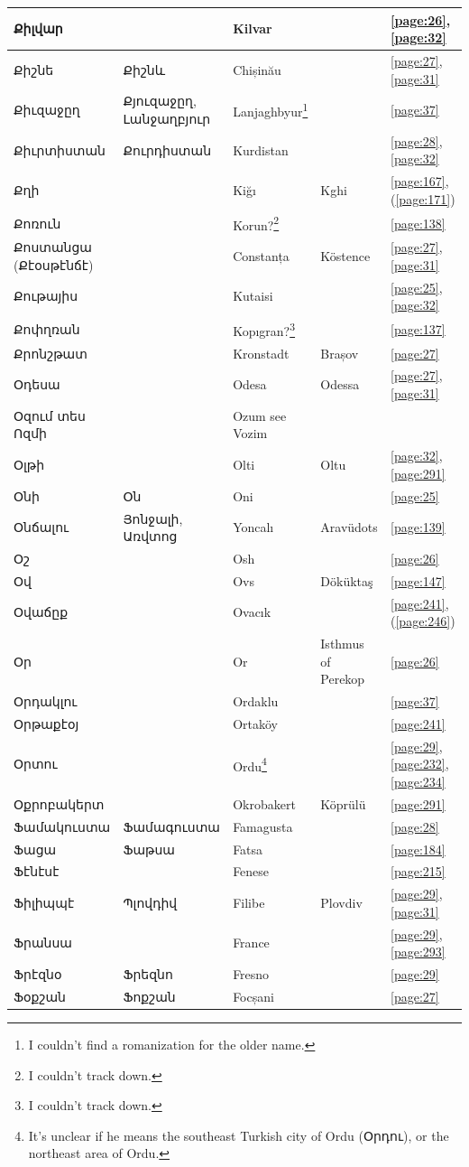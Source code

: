 \begin{center}
\begin{longtable}{|p{}|p{3cm}|p{3cm}|p{2cm}|p{3cm}|}
	Քիլվար& & Kilvar& &\ref{page:26}, \ref{page:32}\\ \hline
	Քիշնե& Քիշնև& Chișinău& &\ref{page:27}, \ref{page:31}\\ \hline
	Քիւզաջըղ& Քյուզաջըղ, Լանջաղբյուր& Lanjaghbyur\footnote{I couldn't find a romanization for the older name.} & &\ref{page:37}\\ \hline
	Քիւրտիստան& Քուրդիստան&Kurdistan & &\ref{page:28}, \ref{page:32}\\ \hline
	Քղի& &Kiğı &Kghi &\ref{page:167}, (\ref{page:171})\\ \hline
	Քոռուն& & Korun?\footnote{I couldn't track down.}& &\ref{page:138}\\ \hline
	Քոստանցա (Քէօսթէնճէ)&& Constanța& Köstence&   \ref{page:27}, \ref{page:31}\\ \hline
	Քութայիս& & Kutaisi& &\ref{page:25}, \ref{page:32}\\ \hline
	Քոփղռան& &Kopıgran?\footnote{I couldn't track down.} & &\ref{page:137}\\ \hline
	Քրոնշթատ& & Kronstadt& Brașov &\ref{page:27}\\ \hline
	Օդեսա& &Odesa &Odessa &\ref{page:27}, \ref{page:31}\\ \hline
	Օզում տես Ոզմի& &Ozum see Vozim & &\\ \hline
	Օլթի& & Olti &Oltu &\ref{page:32}, \ref{page:291}\\ \hline
	Օնի& Օն&Oni & &\ref{page:25}\\ \hline
	Օնճալու&Յոնջալի, Առվտոց &Yoncalı &Aravüdots &\ref{page:139}\\ \hline
	Օշ& & Osh& &\ref{page:26}\\ \hline
	Օվ& &Ovs & Döküktaş&\ref{page:147}\\ \hline
	Օվաճըք& & Ovacık& &\ref{page:241}, (\ref{page:246})\\ \hline
	Օր& &  Or&Isthmus of Perekop &\ref{page:26}\\ \hline
	Օրդակլու& &Ordaklu & &\ref{page:37}\\ \hline
	Օրթաքէօյ& &Ortaköy & &\ref{page:241}\\ \hline
	Օրտու& & Ordu\footnote{It's unclear if he means the southeast Turkish city of Ordu (Օրդու), or the northeast area of Ordu.}& &\ref{page:29}, \ref{page:232}, \ref{page:234}\\ \hline
	Օքրոբակերտ& & Okrobakert&Köprülü &\ref{page:291}\\ \hline
	Ֆամակուստա& Ֆամագուստա&Famagusta & &\ref{page:28}\\ \hline
	Ֆացա&Ֆաթսա &Fatsa & &\ref{page:184}\\ \hline
	Ֆէնէսէ& & Fenese& &\ref{page:215}\\ \hline
	Ֆիլիպպէ& Պլովդիվ&Filibe &Plovdiv &\ref{page:29}, \ref{page:31}\\ \hline
	Ֆրանսա& &France & &\ref{page:29}, \ref{page:293}\\ \hline
	Ֆրէզնօ&   Ֆրեզնո & Fresno& &\ref{page:29}\\ \hline
	Ֆօքշան& Ֆոքշան &Focșani& &\ref{page:27}\\ \hline
	\hline
 \end{longtable}
\end{center}


